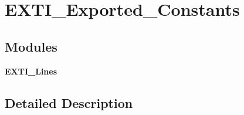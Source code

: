 \section{E\+X\+T\+I\+\_\+\+Exported\+\_\+\+Constants}
\label{group__EXTI__Exported__Constants}
\subsection*{Modules}
\begin{DoxyCompactItemize}
\item 
\textbf{ E\+X\+T\+I\+\_\+\+Lines}
\end{DoxyCompactItemize}


\subsection{Detailed Description}
